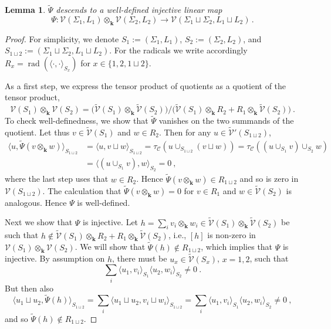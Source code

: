 \documentclass[11pt]{amsart}
\newtheorem{lemma}[thm]{Lemma}
\theoremstyle{definition}
\numberwithin{equation}{section}
\newcommand{\pair}[1]{\langle #1 \rangle}
\def\ourV{\cV}
\def\tbv{\widetilde{\ourV}}
\def\cC{\mathcal{C}}
\def\cV{\mathcal{V}}
\def\kk{{\bm{k}}}
\def\to{\rightarrow}
\def\Rad{{\operatorname{rad}}}
\def\rad{\Rad}
\newcommand{\ot}{\otimes}
\begin{document}
\begin{lemma}\label{lem:disjoint-union}
$\tilde\Psi$ descends to a well-defined injective linear map 
\begin{equation}\label{eq:disjoint-union}
\Psi : \ourV(\Sigma_1, L_1) \ot_{\kk} \ourV(\Sigma_2, L_2) \to \ourV(\Sigma_{1} \sqcup \Sigma_2, L_1 \sqcup L_2)\,.
\end{equation}
\end{lemma}
\begin{proof}
For simplicity, we denote $S_1 := (\Sigma_1, L_1)$, $S_2 := (\Sigma_2, L_2)$, and $S_{1 \sqcup 2} := (\Sigma_1 \sqcup \Sigma_2, L_1 \sqcup L_2)$. For the radicals we write accordingly $R_x = \rad(\pair{\cdot,\cdot}_{S_x})$ for $x \in \{ 1,2, 1 \sqcup 2 \}$. 

As a first step, we express the tensor product of quotients as a quotient of the tensor product,
\[
\ourV(S_1) \ot_{\kk} \ourV(S_2)
=
\big( \tbv(S_1) \otimes_{\kk} \tbv(S_2) \big) / \big( 
\tbv(S_1) \otimes_{\kk} R_2
+
R_1 \otimes_{\kk} \tbv(S_2)
\big) \ .
\]
To check well-definedness, we show that $\tilde\Psi$ vanishes on the two summands of the quotient. Let thus $v \in \tbv(S_1)$ and $w \in R_2$. Then for any $u \in \tbv'(S_{1\sqcup 2})$, 
\[
\begin{split}
\pair{u,\tilde\Psi(v \ot_\kk w)}_{S_{1 \sqcup 2}} 
&= 
\pair{u,v\sqcup w}_{S_{1 \sqcup 2}} 
= 
\tau_{\cC}(u\cup_{S_{1\sqcup 2}} (v \sqcup w)) 
= 
\tau_{\cC}( (u \cup_{S_1} v) \cup_{S_2} w )\\ 
&= \pair{(u \cup_{S_1} v) , w}_{S_2} 
= 
0 \ ,
\end{split}
\]
where the last step uses that $w \in R_2$. Hence $\tilde\Psi(v \ot_\kk w) \in R_{1 \sqcup 2}$ and so is zero in $\ourV(S_{1 \sqcup 2})$. The calculation that $\tilde\Psi(v \ot_\kk w)=0$ for $v \in R_1$ and $w \in \tbv(S_2)$ is analogous. Hence $\Psi$ is well-defined. 

Next we show that $\Psi$ is injective. Let $h = \sum_i  v_i \ot_\kk w_i \in \tbv(S_1) \ot_{\kk} \tbv(S_2)$ be such that $h \notin \tbv(S_1) \otimes_{\kk} R_2
+
R_1 \otimes_{\kk} \tbv(S_2)$, i.e., $[h]$ is non-zero in $\ourV(S_1) \ot_{\kk} \ourV(S_2)$. We will show that $\tilde\Psi(h) \notin R_{1 \sqcup 2}$, which implies that $\Psi$ is injective. By assumption on $h$, there must be $u_x \in \tbv(S_x)$, $x=1,2$, such that
\[
    \sum_i \pair{u_1,v_i}_{S_1}\pair{u_2,w_i}_{S_2} \neq 0 \ .
\]
But then also 
\[
\pair{u_1 \sqcup u_2,\tilde\Psi(h)}_{S_{1 \sqcup 2}} 
= 
\sum_i 
\pair{u_1 \sqcup u_2,v_i \sqcup w_i}_{S_{1 \sqcup 2}} 
= 
\sum_i 
\pair{u_1,v_i}_{S_{1}} 
\pair{u_2,w_i}_{S_{2}} 
\neq 0 \ ,
\]
and so $\tilde\Psi(h) \notin R_{1 \sqcup 2}$.
\end{proof}
\end{document}

